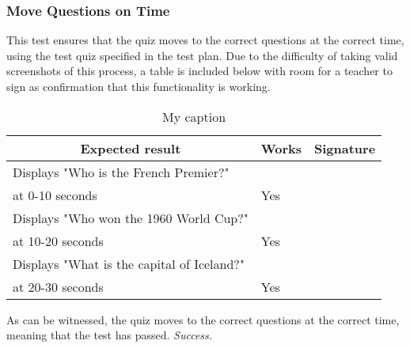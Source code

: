 \subsubsection{Move Questions on Time}
This test ensures that the quiz moves to the correct questions at the correct time, using the test quiz specified in the test plan. Due to the difficulty of taking valid screenshots of this process, a table is included below with room for a teacher to sign as confirmation that this functionality is working.

\begin{table}[]
\centering
\begin{tabular}{|l|l|l|}
\hline
\multicolumn{1}{|c|}{\textbf{Expected result}}              & \multicolumn{1}{c|}{\textbf{Works}} & \multicolumn{1}{c|}{\textbf{Signature}} \\ \hline
Displays "Who is the French Premier?"\\ at 0-10 seconds       & Yes                                 &                                         \\ \hline
Displays "Who won the 1960 World Cup?"\\ at 10-20 seconds     & Yes                                 &                                         \\ \hline
Displays "What is the capital of Iceland?"\\ at 20-30 seconds & Yes                                 &                                         \\ \hline
\end{tabular}
\caption{My caption}
\label{my-label}
\end{table}

As can be witnessed, the quiz moves to the correct questions at the correct time, meaning that the test has passed. \textit{Success.}
